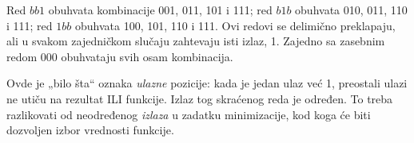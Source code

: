 
Red \(bb1\) obuhvata kombinacije 001, 011, 101 i 111; red \(b1b\) obuhvata 010, 011, 110 i 111; red \(1bb\) obuhvata 100, 101, 110 i 111. Ovi redovi se delimično preklapaju, ali u svakom zajedničkom slučaju zahtevaju isti izlaz, 1. Zajedno sa zasebnim redom 000 obuhvataju svih osam kombinacija.

Ovde je „bilo šta“ oznaka \emph{ulazne} pozicije: kada je jedan ulaz već 1, preostali ulazi ne utiču na rezultat ILI funkcije. Izlaz tog skraćenog reda je određen. To treba razlikovati od neodređenog \emph{izlaza} u zadatku minimizacije, kod koga će biti dozvoljen izbor vrednosti funkcije.
